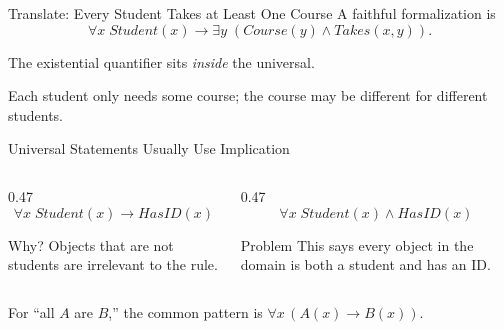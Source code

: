 \documentclass[aspectratio=169,10pt]{beamer}
\begin{document}
\begin{frame}[shrink=12]{Translate: Every Student Takes at Least One Course}
  A faithful formalization is
  \[
    \forall x\; Student(x) \rightarrow
    \exists y\; (Course(y) \land Takes(x,y)).
  \]

  The existential quantifier sits \emph{inside} the universal.

  \begin{keyidea}
    Each student only needs some course; the course may be different for different students.
  \end{keyidea}
\end{frame}

\begin{frame}[shrink=10]{Universal Statements Usually Use Implication}
  \begin{columns}[T,onlytextwidth]
    \begin{column}{0.47\textwidth}
      \[
        \forall x\; Student(x) \rightarrow HasID(x)
      \]
      \begin{block}{Why?}
        Objects that are not students are irrelevant to the rule.
      \end{block}
    \end{column}
    \begin{column}{0.47\textwidth}
      \[
        \forall x\; Student(x) \land HasID(x)
      \]
      \begin{block}{Problem}
        This says every object in the domain is both a student and has an ID.
      \end{block}
    \end{column}
  \end{columns}

  \begin{keyidea}
    For ``all $A$ are $B$,'' the common pattern is $\forall x\,(A(x)\rightarrow B(x))$.
  \end{keyidea}
\end{frame}
\end{document}
